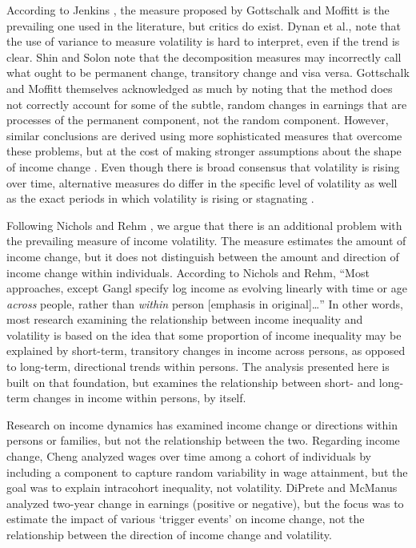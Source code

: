 \documentclass[12pt]{article}
\begin{document}
According to Jenkins \citeyearpar{jenkins_2011}, the measure proposed by Gottschalk and Moffitt \citeyearpar{gottschalk_moffitt_1994} is the prevailing one used in the literature, but critics do exist. Dynan et al., \citeyearpar{dynan_etal_2012} note that the use of variance to measure volatility is hard to interpret, even if the trend is clear. Shin and Solon \citeyearpar{shin_solon_2011} note that the decomposition measures may incorrectly call what ought to be permanent change, transitory change and visa versa. Gottschalk and Moffitt \citeyearpar{gottschalk_moffitt_2009} themselves acknowledged as much by noting that the method does not correctly account for some of the subtle, random changes in earnings that are processes of the permanent component, not the random component. However, similar conclusions are derived using more sophisticated measures that overcome these problems, but at the cost of making stronger assumptions about the shape of income change \citep{moffitt_gottschalk_2012}. Even though there is broad consensus that volatility is rising over time, alternative measures do differ in the specific level of volatility as well as the exact periods in which volatility is rising or stagnating \citep{western_etal_2012}.

Following Nichols and Rehm \citeyearpar{nichols_rehm_2014}, we argue that there is an additional problem with the prevailing measure of income volatility. The measure estimates the amount of income change, but it does not distinguish between the amount and direction of income change within individuals. According to Nichols and Rehm, ``Most approaches, except Gangl \citeyearpar{gangl_2005} specify log income as evolving linearly with time or age \emph{across} people, rather than \emph{within} person [emphasis in original]\dots'' In other words, most research examining the relationship between income inequality and volatility is based on the idea that some proportion of income inequality may be explained by short-term, transitory changes in income across persons, as opposed to long-term, directional trends within persons. The analysis presented here is built on that foundation, but examines the relationship between short- and long-term changes in income within persons, by itself.

Research on income dynamics has examined income change or directions within persons or families, but not the relationship between the two. Regarding income change, Cheng \citeyearpar{cheng_2014} analyzed wages over time among a cohort of individuals by including a component to capture random variability in wage attainment, but the goal was to explain intracohort inequality, not volatility. DiPrete and McManus \citeyearpar{diprete_mcmanus_2000} analyzed two-year change in earnings (positive or negative), but the focus was to estimate the impact of various `trigger events' on income change, not the relationship between the direction of income change and volatility.
\end{document}
